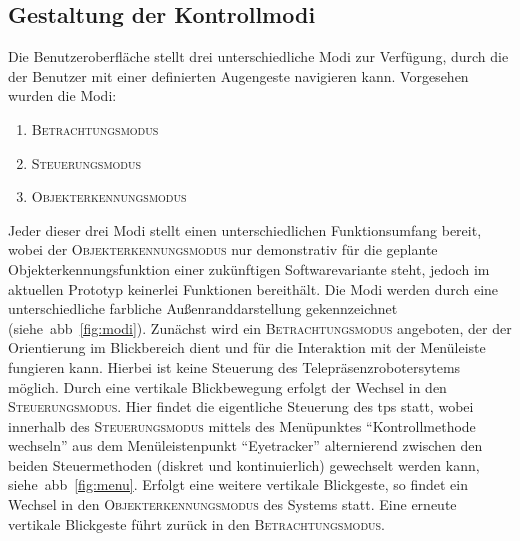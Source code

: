 \subsection{Gestaltung der Kontrollmodi}
\label{subsection:gestKontroll}
Die Benutzeroberfläche stellt drei unterschiedliche Modi zur Verfügung, durch die der Benutzer mit einer definierten Augengeste navigieren kann. Vorgesehen wurden die Modi:
\begin{enumerate}
\item \textsc{Betrachtungsmodus}
\item \textsc{Steuerungsmodus}
\item \textsc{Objekterkennungsmodus}
\end{enumerate}
Jeder dieser drei Modi stellt einen unterschiedlichen Funktionsumfang bereit, wobei der \textsc{Objekterkennungsmodus} nur demonstrativ für die geplante Objekterkennungsfunktion einer zukünftigen Softwarevariante steht, jedoch im aktuellen Prototyp keinerlei Funktionen bereithält. Die Modi werden durch eine unterschiedliche farbliche Außenranddarstellung gekennzeichnet (siehe~\acs{abb}~\ref{fig:modi}). Zunächst wird ein \textsc{Betrachtungsmodus} angeboten, der der Orientierung im Blickbereich dient und für die Interaktion mit der Menüleiste fungieren kann. Hierbei ist keine Steuerung des Telepräsenzrobotersytems möglich. Durch eine vertikale Blickbewegung erfolgt der Wechsel in den \textsc{Steuerungsmodus}. Hier findet die eigentliche Steuerung des \acs{tps} statt, wobei innerhalb des \textsc{Steuerungsmodus} mittels des Menüpunktes \enquote{Kontrollmethode wechseln} aus dem Menüleistenpunkt \enquote{Eyetracker} alternierend zwischen den beiden Steuermethoden (diskret und kontinuierlich) gewechselt werden kann, siehe~\acs{abb}~\ref{fig:menu}. 
Erfolgt eine weitere vertikale Blickgeste, so findet ein Wechsel in den \textsc{Objekterkennungsmodus} des Systems statt. Eine erneute vertikale Blickgeste führt zurück in den \textsc{Betrachtungsmodus}.
